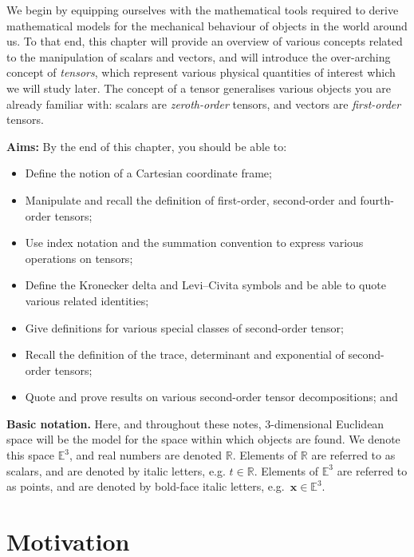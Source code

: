 \documentclass[
  letterpaper,
  DIV=11,
  numbers=noendperiod]{scrreprt}
\theoremstyle{plain}
\theoremstyle{remark}
\begin{document}
We begin by equipping ourselves with the mathematical tools required to
derive mathematical models for the mechanical behaviour of objects in
the world around us. To that end, this chapter will provide an overview
of various concepts related to the manipulation of scalars and vectors,
and will introduce the over-arching concept of \emph{tensors}, which
represent various physical quantities of interest which we will study
later. The concept of a tensor generalises various objects you are
already familiar with: scalars are \emph{zeroth-order} tensors, and
vectors are \emph{first-order} tensors.

\textbf{Aims:} By the end of this chapter, you should be able to:

\begin{itemize}
\item
  Define the notion of a Cartesian coordinate frame;
\item
  Manipulate and recall the definition of first-order, second-order and
  fourth-order tensors;
\item
  Use index notation and the summation convention to express various
  operations on tensors;
\item
  Define the Kronecker delta and Levi--Civita symbols and be able to
  quote various related identities;
\item
  Give definitions for various special classes of second-order tensor;
\item
  Recall the definition of the trace, determinant and exponential of
  second-order tensors;
\item
  Quote and prove results on various second-order tensor decompositions;
  and
\end{itemize}

\textbf{Basic notation.} Here, and throughout these notes, 3-dimensional
Euclidean space will be the model for the space within which objects are
found. We denote this space \({\mathbb{E}}^3\), and real numbers are
denoted \({\mathbb{R}}\). Elements of \({\mathbb{R}}\) are referred to
as scalars, and are denoted by italic letters, e.g.
\(t\in{\mathbb{R}}\). Elements of \({\mathbb{E}}^3\) are referred to as
points, and are denoted by bold-face italic letters,
e.g.~\({\boldsymbol{x}}\in{\mathbb{E}}^3\).

\section{Motivation}\label{motivation}
\end{document}
